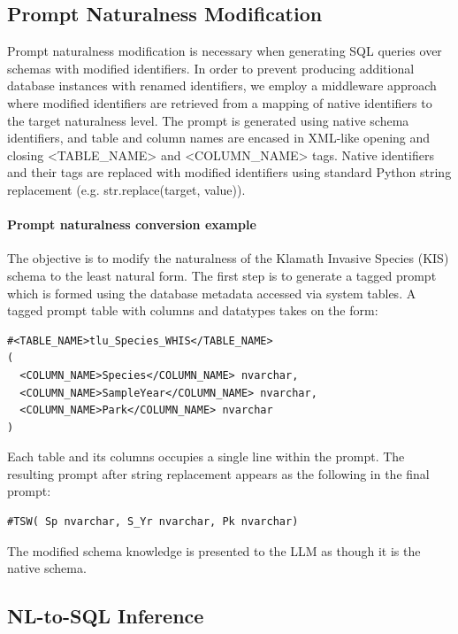 \subsection{Prompt Naturalness Modification}

Prompt naturalness modification is necessary when generating SQL queries over schemas with modified identifiers.
In order to prevent producing additional database instances with renamed identifiers, we employ a middleware approach where modified identifiers are retrieved from a mapping of native identifiers to the target naturalness level.
The prompt is generated using native schema identifiers, and table and column names are encased in XML-like opening and closing <TABLE\_NAME> and <COLUMN\_NAME> tags.
Native identifiers and their tags are replaced with modified identifiers using standard Python string replacement (e.g. str.replace(target, value)).

\paragraph{Prompt naturalness conversion example}
The objective is to modify the naturalness of the Klamath Invasive Species (KIS) schema to the least natural form.
The first step is to generate a tagged prompt which is formed using the database metadata accessed via system tables.
A tagged prompt table with columns and datatypes takes on the form:
\begin{verbatim}
#<TABLE_NAME>tlu_Species_WHIS</TABLE_NAME>
( 
  <COLUMN_NAME>Species</COLUMN_NAME> nvarchar, 
  <COLUMN_NAME>SampleYear</COLUMN_NAME> nvarchar, 
  <COLUMN_NAME>Park</COLUMN_NAME> nvarchar
)
\end{verbatim}
Each table and its columns occupies a single line within the prompt.
The resulting prompt after string replacement appears as the following in the final prompt:
\begin{verbatim}
#TSW( Sp nvarchar, S_Yr nvarchar, Pk nvarchar)
\end{verbatim}

The modified schema knowledge is presented to the LLM as though it is the native schema.


\subsection{NL-to-SQL Inference}

